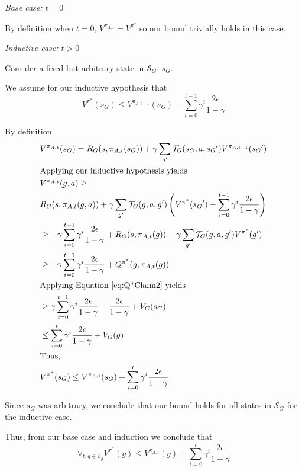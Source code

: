 \documentclass{article}
\begin{document}
\textit{Base case: $t=0$}

By definition when $t=0$, $V^{\pi_{A,t}} = V^{\pi^*}$ so our bound trivially holds in this case.

\textit{Inductive case: $t > 0$}

Consider a fixed but arbitrary state in $\mathcal{S}_G$, $s_G$.

We assume for our inductive hypothesis that
\begin{equation}
V^{\pi^*}(s_G) \leq V^{\pi_{A,t-1}}(s_G)  + \sum_{i=0}^{t-1}\gamma^i \frac{2\epsilon}{1-\gamma}
\end{equation}

By definition 
\begin{align*}
&V^{\pi_{A,t}}(s_G) = R_G(s, \pi_{A,t}(s_G)) + \gamma \sum_{g'}\mathcal{T}_G(s_G, a, {s_G}')V^{\pi_{A,t-1}}({s_G}')\\
&\text{Applying our inductive hypothesis yields}\\
&V^{\pi_{A,t}}(g, a) \geq\\
&R_G(s, \pi_{A,t}(g, a)) + \gamma \sum_{g'}\mathcal{T}_G(g, a, g')\left(V^{\pi^*}({s_G}') - \sum_{i=0}^{t-1}\gamma^i \frac{2\epsilon}{1-\gamma} \right)\\
&\geq -\gamma\sum_{i=0}^{t-1}\gamma^i \frac{2\epsilon}{1-\gamma} + R_G(s, \pi_{A,t}(g)) + \gamma \sum_{g'}\mathcal{T}_G(g, a, g')V^{\pi^*}(g')\\
&\geq -\gamma\sum_{i=0}^{t-1}\gamma^i \frac{2\epsilon}{1-\gamma} + Q^{\pi^*}(g, \pi_{A,t} (g))\\
&\text{Applying Equation \ref{eq:Q*Claim2} yields}\\
&\geq \gamma\sum_{i=0}^{t-1}\gamma^i \frac{2\epsilon}{1-\gamma} - \frac{2\epsilon}{1-\gamma} + V_{G}(s_G)\\
&\leq \sum_{i=0}^{t}\gamma^i \frac{2\epsilon}{1-\gamma} + V_G(g)\\
& \text{Thus,}\\
&V^{\pi^*}(s_G) \leq V^{\pi_{A,t}}(s_G)  + \sum_{i=0}^{t}\gamma^i \frac{2\epsilon}{1-\gamma}
\end{align*}

Since $s_G$ was arbitrary, we conclude that our bound holds for all states in $\mathcal{S}_G$ for the inductive case.

Thus, from our base case and induction we conclude that
\begin{equation}
\forall_{t, g \in \mathcal{S}_g} V^{\pi^*}(g) \leq  V^{\pi_{A,t}}(g) + \sum_{i=0}^{t}\gamma^i \frac{2\epsilon}{1-\gamma}
\end{equation}
\end{document}
